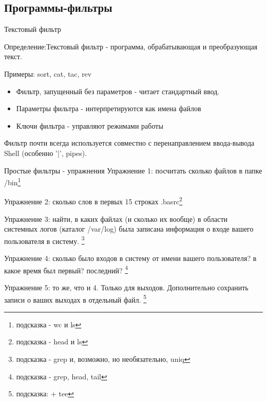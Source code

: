 \subsection{Программы-фильтры}

\begin{frame}{Текстовый фильтр}

  Определение:\newline \alert{Текстовый фильтр} - программа, обрабатывающая и преобразующая текст. \newline

  Примеры: \alert{sort}, \alert{cat}, \alert{tac}, \alert{rev} \pause
  \begin{itemize}
    \item Фильтр, запущенный без параметров - читает стандартный ввод. 
    \item Параметры фильтра - интерпретируются как имена файлов
    \item Ключи фильтра - управляют режимами работы
  \end{itemize} \pause

  Фильтр почти всегда используется совместно с перенаправлением ввода-вывода Shell (особенно '|', pipes).

\end{frame}



\begin{frame}{Простые фильтры - упражнения}
  \alert{Упражнение 1}: посчитать сколько файлов в папке /bin\footnote{подсказка - \alert{wc} и \alert{ls}}

  \alert{Упражнение 2}: сколько слов в первых 15 строках .basrc\footnote{подсказка - \alert{head} и \alert{ls}}

  \alert{Упражнение 3}: найти, в каких файлах (и сколько их вообще) в области системных логов (каталог \alert{/var/log}) была записана информация о входе вашего пользователя в систему. \footnote{подсказка - \alert{grep} и, возможно, но необязательно, \alert{uniq}}

  \alert{Упражнение 4}: сколько было входов в систему от имени вашего пользователя? в какое время был первый? последний? \footnote{подсказка - \alert{grep}, \alert{head}, \alert{tail}}

  \alert{Упражнение 5}: то же, что и 4. Только для выходов. Дополнительно сохранить записи о ваших выходах в отдельный файл. \footnote{подсказка: + \alert{tee}}





\end{frame}

